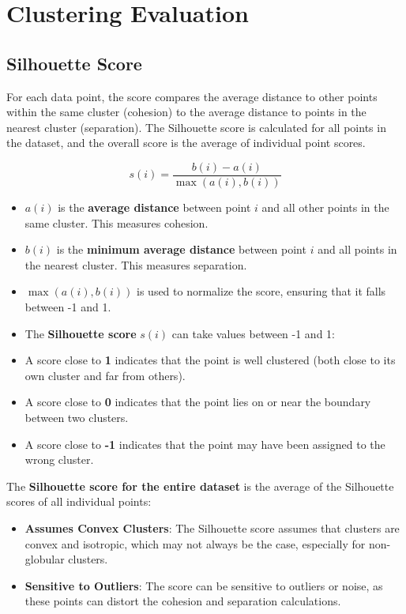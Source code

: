\documentclass[10pt,a4paper]{article}
\begin{document}
	\section{Clustering Evaluation}

	\subsection{Silhouette Score}
	For each data point, the score compares the average distance to other points within the same cluster (cohesion) to the average distance to points in the nearest cluster (separation). The Silhouette score is calculated for all points in the dataset, and the overall score is the average of individual point scores.
	
	\[
	s(i) = \frac{b(i) - a(i)}{\max(a(i), b(i))}
	\]

	\begin{itemize}
		\item $ a(i)$ is the \textbf{average distance} between point \( i \) and all other points in the same cluster. This measures cohesion.
		\item $ b(i) $ is the \textbf{minimum average distance} between point \( i \) and all points in the nearest cluster. This measures separation.
		\item $ \max(a(i), b(i)) $ is used to normalize the score, ensuring that it falls between -1 and 1.
	\end{itemize}

	\begin{itemize}
		\item The \textbf{Silhouette score} $s(i)$ can take values between -1 and 1:
		\item A score close to \textbf{1} indicates that the point is well clustered (both close to its own cluster and far from others).
		\item A score close to \textbf{0} indicates that the point lies on or near the boundary between two clusters.
		\item A score close to \textbf{-1} indicates that the point may have been assigned to the wrong cluster.
	\end{itemize}

	The \textbf{Silhouette score for the entire dataset} is the average of the Silhouette scores of all individual points:

	\begin{itemize}
		\item \textbf{Assumes Convex Clusters}: The Silhouette score assumes that clusters are convex and isotropic, which may not always be the case, especially for non-globular clusters.
		\item \textbf{Sensitive to Outliers}: The score can be sensitive to outliers or noise, as these points can distort the cohesion and separation calculations.
	\end{itemize}
\end{document}
